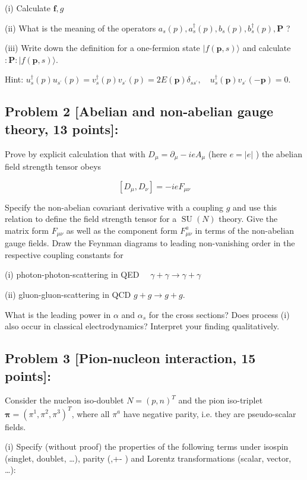 \documentclass[10pt, letterpaper]{article}
\begin{document}
(i) Calculate $\mathbf{f}, g$

(ii) What is the meaning of the operators $a_s(p), a_s^{\dagger}(p), b_s(p), b_s^{\dagger}(p), \mathbf{P}$ ?

(iii) Write down the definition for a one-fermion state $|f(\mathbf{p}, s)\rangle$ and calculate $: \mathbf{P}:|f(\mathbf{p}, s)\rangle$.

Hint: $u_s^{\dagger}(p) u_{s^{\prime}}(p)=v_s^{\dagger}(p) v_{s^{\prime}}(p)=2 E(\mathbf{p}) \delta_{s s^{\prime}}, \quad u_s^{\dagger}(\mathbf{p}) v_{s^{\prime}}(-\mathbf{p})=0$.



\subsection{Problem 2 [Abelian and non-abelian gauge theory, 13 points]:}
Prove by explicit calculation that with $D_\mu=\partial_\mu-i e A_\mu$ (here $e=|e|$ ) the abelian field strength tensor obeys

$$
\left[D_\mu, D_\nu\right]=-i e F_{\mu \nu}
$$


Specify the non-abelian covariant derivative with a coupling $g$ and use this relation to define the field strength tensor for a $\operatorname{SU}(N)$ theory. Give the matrix form $F_{\mu \nu}$ as well as the component form $F_{\mu \nu}^a$ in terms of the non-abelian gauge fields.
Draw the Feynman diagrams to leading non-vanishing order in the respective coupling constants for

(i) photon-photon-scattering in QED $\quad \gamma+\gamma \longrightarrow \gamma+\gamma$

(ii) gluon-gluon-scattering in QCD $g+g \longrightarrow g+g$.

What is the leading power in $\alpha$ and $\alpha_s$ for the cross sections? Does process (i) also occur in classical electrodynamics? Interpret your finding qualitatively.


\subsection{Problem 3 [Pion-nucleon interaction, 15 points]:}

Consider the nucleon iso-doublet $N=(p, n)^T$ and the pion iso-triplet $\boldsymbol{\pi}=\left(\pi^1, \pi^2, \pi^3\right)^T$, where all $\pi^a$ have negative parity, i.e. they are pseudo-scalar fields.

(i) Specify (without proof) the properties of the following terms under isospin (singlet, doublet, …), parity (,+- ) and Lorentz transformations (scalar, vector, …):
\end{document}
